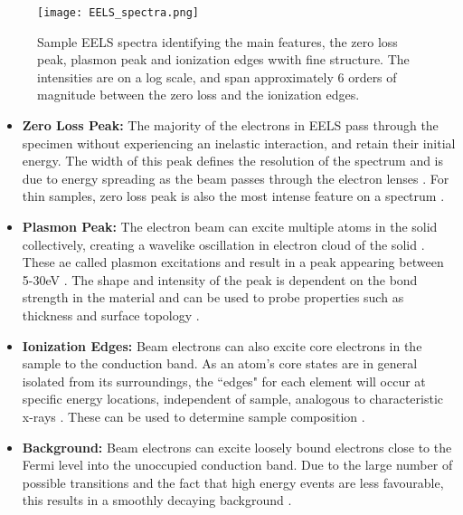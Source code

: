 \begin{figure}
	\centering
	\texttt{[image: EELS\_spectra.png]}
	\caption{Sample EELS spectra identifying the main features, the zero loss peak, plasmon peak and ionization edges wwith fine structure.   The intensities are on a log scale, and span approximately 6 orders of magnitude between the zero loss and the ionization edges.  }
	\label{EELS_spectra}
\end{figure}

\begin{itemize}
	\item \textbf{Zero Loss Peak:} The majority of the electrons in EELS pass through the specimen without experiencing an inelastic interaction, and retain their initial energy.  The width of this peak defines the resolution of the spectrum and is due to energy spreading as the beam passes through the electron lenses \cite{colliex_illustrated_1985}.  For thin samples, zero loss peak is also the most intense feature on a spectrum \cite{Egerton}.  
	
	\item \textbf{Plasmon Peak:}  The electron beam can excite multiple atoms in the solid collectively, creating a wavelike oscillation in electron cloud of the solid \cite{Egerton}.  These ae called plasmon excitations and result in a peak appearing between 5-30eV \cite{Egerton}.  The shape and intensity of the peak is dependent on the bond strength in the material and can be used to probe properties such as thickness and surface topology \cite{malis_eels_1988,nelayah_mapping_2007}. 
	
	\item \textbf{Ionization Edges:} Beam electrons can also excite core electrons in the sample to the conduction band.  As an atom's core states are in general isolated from its surroundings, the ``edges" for each element will occur at specific energy locations, independent of sample, analogous to characteristic x-rays \cite{Egerton}. These can be used to determine sample composition \cite{Egerton}.  
	
	\item  \textbf{Background:} Beam electrons can excite loosely bound electrons close to the Fermi level into the unoccupied conduction band.  Due to the large number of possible transitions and the fact that high energy events are less favourable, this results in a smoothly decaying background \cite{Egerton}.

	
\end{itemize}

